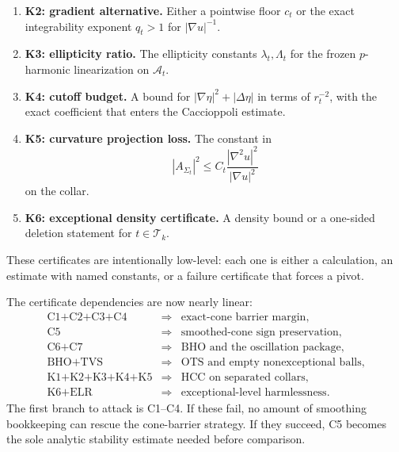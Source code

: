 \begin{remark}
\begin{enumerate}
    \item \textbf{K2: gradient alternative.}
    Either a pointwise floor \(c_t\) or the exact integrability exponent
    \(q_t>1\) for \(|\nabla u|^{-1}\).

    \item \textbf{K3: ellipticity ratio.}
    The ellipticity constants \(\lambda_t,\Lambda_t\) for the frozen
    \(p\)-harmonic linearization on \(\mathcal A_t\).

    \item \textbf{K4: cutoff budget.}
    A bound for \(|\nabla\eta|^2+|\Delta\eta|\) in terms of \(r_t^{-2}\), with
    the exact coefficient that enters the Caccioppoli estimate.

    \item \textbf{K5: curvature projection loss.}
    The constant in
    \[
        |A_{\Sigma_t}|^2
        \le C_t\frac{|\nabla^2u|^2}{|\nabla u|^2}
    \]
    on the collar.

    \item \textbf{K6: exceptional density certificate.}
    A density bound or a one-sided deletion statement for \(t\in\mathcal T_k\).
\end{enumerate}
These certificates are intentionally low-level: each one is either a
calculation, an estimate with named constants, or a failure certificate that
forces a pivot.
\end{remark}

\begin{remark}
\label{rem:TipNeckPicoDependencyMatrix}
The certificate dependencies are now nearly linear:
\[
\begin{array}{ccl}
    \text{C1+C2+C3+C4} &\Longrightarrow& \text{exact-cone barrier margin},\\
    \text{C5} &\Longrightarrow& \text{smoothed-cone sign preservation},\\
    \text{C6+C7} &\Longrightarrow& \text{BHO and the oscillation package},\\
    \text{BHO+TVS} &\Longrightarrow& \text{OTS and empty nonexceptional balls},\\
    \text{K1+K2+K3+K4+K5} &\Longrightarrow& \text{HCC on separated collars},\\
    \text{K6+ELR} &\Longrightarrow& \text{exceptional-level harmlessness}.
\end{array}
\]
The first branch to attack is C1--C4.  If these fail, no amount of smoothing
bookkeeping can rescue the cone-barrier strategy.  If they succeed, C5 becomes
the sole analytic stability estimate needed before comparison.
\end{remark}

